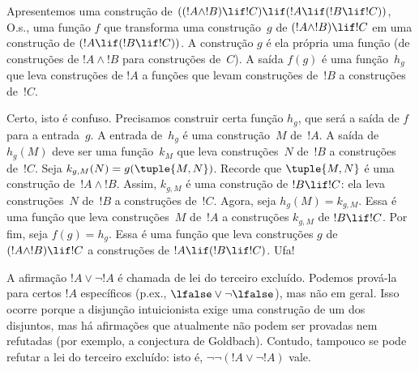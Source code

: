\documentclass[../../../include/open-logic-section]{subfiles}
\begin{document}
\begin{ex}
Apresentemos uma construção de $((!A \land !B) \lif !C) \lif (!A \lif
(!B \lif !C))$, O.s.\@, uma função $f$ que transforma uma construção~$g$
de $(!A \land !B) \lif !C$ em uma construção de $(!A \lif (!B \lif
!C))$. A construção $g$ é ela própria uma função (de construções de
$!A \land !B$ para construções de~$C$). A saída $f(g)$ é uma
função~$h_g$ que leva construções de $!A$ a funções que levam construções
de~$!B$ a construções de~$!C$.

Certo, isto é confuso. Precisamos construir certa função $h_g$, que
será a saída de $f$ para a entrada~$g$. A entrada de~$h_g$ é uma
construção~$M$ de~$!A$. A saída de $h_g(M)$ deve ser uma função~$k_M$
que leva construções~$N$ de~$!B$ a construções de~$!C$. Seja
$k_{g,M}(N) = g(\tuple{M, N})$. Recorde que $\tuple{M, N}$ é uma
construção de~$!A \land !B$. Assim, $k_{g,M}$ é uma construção de
$!B \lif !C$: ela leva construções~$N$ de~$!B$ a construções de~$!C$.
Agora, seja $h_g(M) = k_{g,M}$. Essa é uma função que leva construções~$M$
de~$!A$ a construções $k_{g,M}$ de $!B \lif !C$. Por fim, seja
$f(g) = h_g$. Essa é uma função que leva construções $g$ de
$(!A \land !B) \lif !C$ a construções de $!A \lif (!B \lif !C)$.
Ufa!{}
\end{ex}

A afirmação $!A \lor \lnot !A$ é chamada de lei do terceiro excluído.
Podemos prová-la para certos $!A$ específicos (p.ex.,
$\lfalse \lor \lnot \lfalse$), mas não em geral. Isso ocorre porque a
disjunção intuicionista exige uma construção de um dos disjuntos, mas
há afirmações que atualmente não podem ser provadas nem refutadas
(por exemplo, a conjectura de Goldbach). Contudo, tampouco se pode
refutar a lei do terceiro excluído: isto é, $\lnot \lnot (!A \lor
\lnot !A)$ vale.
\end{document}

